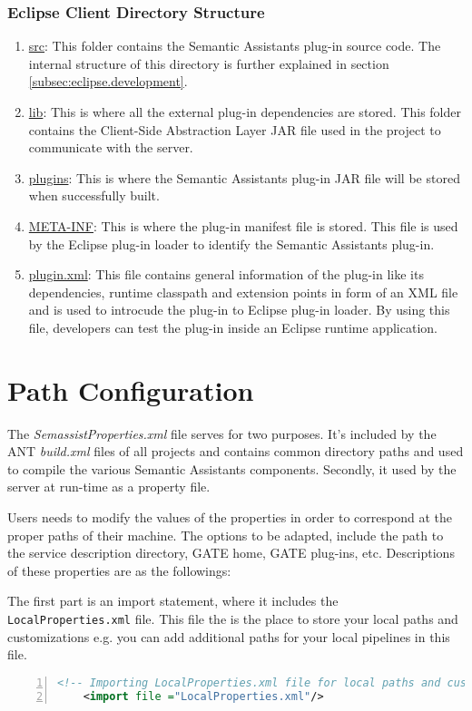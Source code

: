 \subsubsection{Eclipse Client Directory Structure}
\begin{enumerate}
\item \url{src}: This folder contains the Semantic Assistants plug-in source
code. The internal structure of this directory is further explained in section
\ref{subsec:eclipse.development}.
\item \url{lib}: This is where all the external plug-in dependencies are stored.
This folder contains the Client-Side Abstraction Layer JAR file used in the
project to communicate with the server.
\item \url{plugins}: This is where the Semantic Assistants plug-in JAR file will
be stored when successfully built.
\item \url{META-INF}: This is where the plug-in manifest file is stored. This
file is used by the Eclipse plug-in loader to identify the Semantic Assistants
plug-in.
\item \url{plugin.xml}: This file
contains general information of the plug-in like its dependencies, runtime
classpath and extension points in form of an XML file and is used to
introcude the plug-in to Eclipse plug-in loader. By using this file, developers
can test the plug-in inside an Eclipse runtime application.
\end{enumerate}

\section{Path Configuration}
The \emph{SemassistProperties.xml} file serves for two purposes.  It's
included by the ANT \emph{build.xml} files of all projects and
contains common directory paths and used to compile the various
Semantic Assistants components. Secondly, it used by the server at
run-time as a property file.

Users needs to modify the values of the properties in order to
correspond at the proper paths of their machine. The options to be
adapted, include the path to the service description directory, GATE
home, GATE plug-ins, etc. Descriptions of these properties are as the
followings:

The first part is an import statement, where it includes the
\texttt{LocalProperties.xml} file. This file the is the place to store
your local paths and customizations e.g. you can add additional paths
for your local pipelines in this file.
\begin{lstlisting}[language=XML,numbers=left,xleftmargin=8mm,columns=flexible]
    <!-- Importing LocalProperties.xml file for local paths and customizations -->
    <import file ="LocalProperties.xml"/>
\end{lstlisting}

